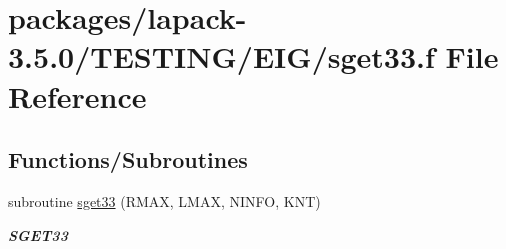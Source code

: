 \hypertarget{sget33_8f}{}\section{packages/lapack-\/3.5.0/\+T\+E\+S\+T\+I\+N\+G/\+E\+I\+G/sget33.f File Reference}
\label{sget33_8f}
\subsection*{Functions/\+Subroutines}
\begin{DoxyCompactItemize}
\item 
subroutine \hyperlink{group__single__eig_ga3a331380ca2ad1894f1324093ca0b6bc}{sget33} (R\+M\+A\+X, L\+M\+A\+X, N\+I\+N\+F\+O, K\+N\+T)
\begin{DoxyCompactList}\small\item\em {\bfseries S\+G\+E\+T33} \end{DoxyCompactList}\end{DoxyCompactItemize}
